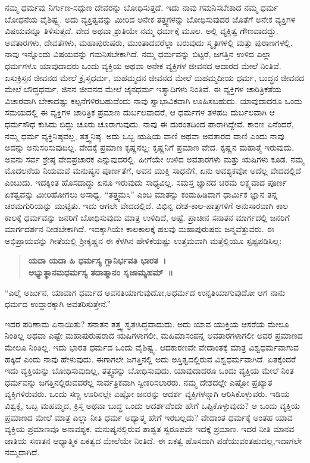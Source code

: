 ನಮ್ಮ ಧರ್ಮವು ನಿರ್ಗುಣ-ಸದ್ಗುಣ ದೇವರನ್ನು ಬೋಧಿಸುತ್ತದೆ. ಇದು ನಾವು ಗಮನಿಸಬೇಕಾದ ನಮ್ಮ ಧರ್ಮ ಬೋಧನೆಯ ವೈಶಿಷ್ಟ್ಯ. ಅದು ವ್ಯಕ್ತಿತ್ವವನ್ನು ಮೀರಿದ ಅನೇಕ ತತ್ತ್ವಗಳನ್ನು ಬೋಧಿಸುವುದರ ಜೊತೆಗೆ ಅನೇಕ ವ್ಯಕ್ತಿಗಳ ವಿಷಯವನ್ನೂ ತಿಳಿಸುತ್ತದೆ. ವೇದ ಅಥವಾ ಶ್ರುತಿಯೇ ನಮ್ಮ ಧರ್ಮಕ್ಕೆ ಮೂಲ. ಅಲ್ಲಿ ವ್ಯಕ್ತಿತ್ವ ಗೌಣವಾದದ್ದು. ಅವತಾರಗಳು, ದೇವತೆಗಳು, ಮಹಾಪುರುಷರು, ಮುಂತಾದವರೆಲ್ಲಾ ಬರುವುದು ಸ್ಮೃತಿಗಳಲ್ಲಿ ಮತ್ತು ಪುರಾಣಗಳಲ್ಲಿ. ನಾವು ಇನ್ನೊಂದು ವಿಷಯವನ್ನು ಗಮನಿಸಬೇಕಾಗಿದೆ. ನಮ್ಮ ಧರ್ಮವನ್ನು ಬಿಟ್ಟರೆ, ಜಗತ್ತಿನ ಉಳಿದ ಎಲ್ಲಾ ಧರ್ಮಗಳೂ ಯಾವುದಾದರು ಒಂದು ವ್ಯಕ್ತಿಯ ಅಥವಾ ಅನೇಕ ವ್ಯಕ್ತಿಗಳ ಜೀವನದ ಆದಾರದ ಮೇಲೆ ನಿಂತಿವೆ. ಏಸುಕ್ರಿಸ್ತನ ಜೀವನದ ಮೇಲೆ ಕ್ರೈಸ್ತಧರ್ಮ, ಮಹಮ್ಮದನ ಜೀವನದ ಮೇಲೆ ಮಹಮ್ಮದೀಯ ಧರ್ಮ, ಬುದ್ಧನ ಜೀವನದ ಮೇಲೆ ಬೌದ್ಧಧರ್ಮ, ಜಿನನ ಜೀವನದ ಮೇಲೆ ಜೈನಧರ್ಮ ಇತ್ಯಾದಿಗಳು ನಿಂತಿವೆ. ಈ ವ್ಯಕ್ತಿಗಳ ಚಾರಿತ್ರಿಕತೆಯ ವಿಚಾರವಾಗಿ ಬೇಕಾದಷ್ಟು ಕಲ್ಪನೆಗಳಿರಬಹುದೆಂದು ನಾವು ಸ್ವಾಭಾವಿಕವಾಗಿ ಊಹಿಸಬಹುದು. ಯಾವುದಾದರೂ ಒಂದು ಸಮಯದಲ್ಲಿ ಈ ವ್ಯಕ್ತಿಗಳ ಚಾರಿತ್ರಿಕ ಪ್ರಮಾಣ ದುರ್ಬಲವಾದರೆ, ಆ ಧರ್ಮಗಳ ತಳಹದಿ ದುರ್ಬಲವಾಗಿ ಆ ಧರ್ಮಸೌಧ ಕುಸಿದು ಬಿದ್ದು ಚೂರು ಚೂರಾಗುವುದು. ನಾವು ಈ ದುರಂತದಿಂದ ಪಾರಾಗಿದ್ದೇವೆ. ಕಾರಣ ಏನೆಂದರೆ, ನಮ್ಮ ಧರ್ಮ ವ್ಯಕ್ತಿನಿಷ್ಠವಲ್ಲ, ತತ್ತ್ವನಿಷ್ಠ. ಅದು ಒಬ್ಬ ಋಷಿಯ ವಾಣಿ ಅಥವಾ ಅವತಾರದ ವಾಣಿ ಎಂದು ನಾವು ಅದನ್ನು ಅನುಸರಿಸುವುದಿಲ್ಲ. ವೇದಕ್ಕೆ ಪ್ರಮಾಣ ಕೃಷ್ಣನಲ್ಲ; ಕೃಷ್ಣನಿಗೆ ಪ್ರಮಾಣ ವೇದ. ಕೃಷ್ಣನ ಮಹಾತ್ಮೆ ಇರುವುದು, ಅವನು ಸರ್ವ ಶ್ರೇಷ್ಠ ವೇದಪ್ರಚಾರಕ ಎನ್ನುವುದರಲ್ಲಿ. ಹೀಗೆಯೇ ಉಳಿದ ಅವತಾರಗಳು ಮತ್ತು ಋಷಿಗಳು ಕೂಡ. ನಮ್ಮ ಮೊದಲನೆಯ ನಿಯಮವೆ ಮನುಷ್ಯನ ಪೂರ್ಣತೆಗೆ, ಅವನ ಮುಕ್ತಿ ಸಾಧನೆಗೆ, ಏನು ಅವಶ್ಯಕವೋ ಅದೆಲ್ಲ ವೇದದಲ್ಲಿದೆ ಎಂಬುದು. ಇದಕ್ಕಿಂತ ಹೊಸದಾದ್ದು ಏನೂ ಇರುವುದು ಸಾಧ್ಯವಿಲ್ಲ. ಸಮಸ್ತ ಜ್ಞಾನದ ಚರಮ ಲಕ್ಷ್ಯವಾದ ಪೂರ್ಣ ಏಕತ್ವವನ್ನು ಮೀರಿಹೋಗಲು ಅಸಾಧ್ಯ. “ತತ್ತ್ವಮಸಿ” ಎಂಬ ಮಾತನ್ನು ಕಂಡುಹಿಡಿದಾಗ ಧಾರ್ಮಿಕ ಜ್ಞಾನ ತನ್ನ ಚರಮಗುರಿಯನ್ನು ಮುಟ್ಟಿತು. ಇದು ಆಗಲೇ ವೇದದಲ್ಲಿದೆ. ವಿಭಿನ್ನ ದೇಶ-ಕಾಲ-ಪಾತ್ರಗಳಿಗೆ ಅನುಸಾರವಾಗಿ ಕಾಲ ಕಾಲಕ್ಕೆ ಧರ್ಮವನ್ನು ಜನರಿಗೆ ಬೋಧಿಸುವುದು ಮಾತ್ರ ಉಳಿದಿದೆ, ಅಷ್ಟೆ. ಪ್ರಾಚೀನ ಸನಾತನ ಮಾರ್ಗದಲ್ಲಿ ಜನರಿಗೆ ಮಾರ್ಗದರ್ಶನ ನೀಡಬೇಕಾಗಿದೆ. ಇದಕ್ಕಾಗಿಯೇ ಕಾಲಕಾಲಕ್ಕೆ ಹಲವು ಮಹಾಪುರುಷರು ಜನ್ಮವೆತ್ತುವರು. ಈ ಅಭಿಪ್ರಾಯವನ್ನು ಗೀತೆಯಲ್ಲಿ ಶ‍್ರೀಕೃಷ್ಣನ ಈ ಕೆಳಗಿನ ಹೇಳಿಕೆಯಷ್ಟು ಉತ್ತಮವಾಗಿ ಮತ್ತೆಲ್ಲಿಯೂ ಸ್ಪಷ್ಟಪಡಿಸಿಲ್ಲ:

\begin{verse}
\textbf{ಯದಾ ಯದಾ ಹಿ ಧರ್ಮಸ್ಯ ಗ್ಲಾನಿರ್ಭವತಿ ಭಾರತ~।}\\\textbf{ಅಭ್ಯುತ್ಥಾನಮಧರ್ಮಸ್ಯ ತದಾತ್ಮಾನಂ ಸೃಜಾಮ್ಯಹಮ್​~॥}
\end{verse}

“ಎಲೈ ಅರ್ಜುನ, ಯಾವಾಗ ಧರ್ಮದ ಅವನತಿಯಾಗುವುದೋ,\break ಅಧರ್ಮದ ಉನ್ನತಿಯಾಗುವುದೋ ಆಗ ನಾನು ಧರ್ಮದ ಉದ್ಧಾರಕ್ಕಾಗಿ ಅವತರಿಸುತ್ತೇನೆ.”

ಇದರ ಪರಿಣಾಮ ಏನಾಯಿತು? ಸನಾತನ ತತ್ತ್ವ ಸ್ವತಃಸಿದ್ಧವಾದುದು. ಅದು ಯಾವ ಯುಕ್ತಿಯ ಆಸರೆಯ ಮೇಲೂ ನಿಂತಿಲ್ಲ ಅಥವಾ ಎಷ್ಟೇ ಮಹಾಪುರುಷರಾದ ಋಷಿಗಳಾಗಲೀ, ಮಹಿಮಾಸಂಪನ್ನ ಅವತಾರಗಳಾಗಲೀ ಅವರ ಪ್ರಮಾಣದ ಮೇಲೂ ನಿಂತಿಲ್ಲ. ಇದು ಭಾರತ ಧರ್ಮದ ಒಂದು ವೈಶಿಷ್ಟ್ಯ. ಆದಕಾರಣವೇ ವೇದಾಂತಕ್ಕೆ ಮಾತ್ರ ವಿಶ್ವಧರ್ಮವಾಗುವ ಹಕ್ಕಿದೆ ಎಂದು ನಾವು ಹೇಳುವುದು. ಈಗಾಗಲೇ ಜಗತ್ತಿನಲ್ಲಿ ಅದು ಅಸ್ತಿತ್ವದಲ್ಲಿರುವ ವಿಶ್ವಧರ್ಮವಾಗಿದೆ. ಏತಕ್ಕೆಂದರೆ ಇದು ವ್ಯಕ್ತಿಯನ್ನು ಬೋಧಿಸುವುದಿಲ್ಲ, ತತ್ತ್ವವನ್ನು ಬೋಧಿಸುವುದು. ಯಾವುದಾದರೂ ಒಂದು ವ್ಯಕ್ತಿಯ ಮೇಲೆ ನಿಂತ ಧರ್ಮವನ್ನು ಜಗತ್ತಿನಲ್ಲಿರುವವರೆಲ್ಲ ಸಾರ್ವತ್ರಿಕವಾಗಿ ಸ್ವೀಕರಿಸಲಾರರು. ನಮ್ಮ ದೇಶದಲ್ಲೇ ಎಷ್ಟೋ ಪ್ರಖ್ಯಾತ ವ್ಯಕ್ತಿಗಳಿರುವರು. ಒಂದು ಸಣ್ಣ ಊರಿನಲ್ಲೇ ಎಷ್ಟೋ ಜನರನ್ನು ಆದರ್ಶ ವ್ಯಕ್ತಿಗಳನ್ನಾಗಿ ಆರಿಸಿಕೊಳ್ಳುವರು. ಇಡಿಯ ವಿಶ್ವಕ್ಕೆ, ಒಬ್ಬ ಮಹಮ್ಮದ, ಕ್ರಿಸ್ತ ಅಥವಾ ಬುದ್ಧ ಒಂದು ಆದರ್ಶವೆಂದು ಹೇಗೆ ಒಪ್ಪಿಕೊಳ್ಳುವುದು? ಆ ಒಂದು ವ್ಯಕ್ತಿಯ ಪ್ರಮಾಣದ ಮೇಲೆ ಮಾತ್ರ ಎಲ್ಲಾ ನೀತಿ ಧರ್ಮ ಅಧ್ಯಾತ್ಮ ಹೇಗೆ ಇರಬಲ್ಲದು? ವೇದಾಂತ ಧರ್ಮಕ್ಕೆ ಅಂತಹ ಯಾವ ವ್ಯಕ್ತಿಯ ಪ್ರಮಾಣವೂ ಅನಾವಶ್ಯಕ. ಮನುಷ್ಯನಲ್ಲಿರುವ ಶಾಶ್ವತ ಸ್ವರೂಪವೇ ಇದಕ್ಕೆ ಪ್ರಮಾಣ. ಇದರ ನೀತಿ ಮಾನವ ಜಾತಿಯ ಸನಾತನ ಆಧ್ಯಾತ್ಮಿಕ ಏಕತ್ವದ ಮೇಲೆಯೇ ನಿಂತಿದೆ. ಈ ಏಕತ್ವ ಹೊಸದಾಗಿ ಪಡೆಯುವಂತಹುದಲ್ಲ,\break ಇದಾಗಲೇ ನಮ್ಮದಾಗಿದೆ.

